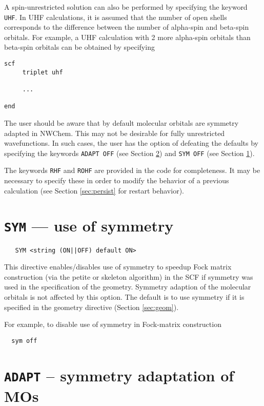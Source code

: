 A spin-unrestricted solution can also be performed by specifying the
keyword \verb+UHF+.  In UHF calculations, it is assumed that the
number of open shells corresponds to the difference between the number
of alpha-spin and beta-spin orbitals.  For example, a UHF calculation
with 2 more alpha-spin orbitals than beta-spin orbitals can be
obtained by specifying

\begin{verbatim}
scf
     triplet uhf

     ...

end
\end{verbatim}

The user should be aware that by default molecular orbitals are
symmetry adapted in NWChem.  This may not be desirable for fully
unrestricted wavefunctions.  In such cases, the user has the option of
defeating the defaults by specifying the keywords \verb+ADAPT OFF+
(see Section \ref{sec:adapt}) and \verb+SYM OFF+ (see Section
\ref{sec:sym}).

The keywords \verb+RHF+ and \verb+ROHF+ are provided in the code for
completeness. It may be necessary to specify these in order to modify
the behavior of a previous calculation (see Section \ref{sec:persist}
  for restart behavior).

\section{{\tt SYM} --- use of symmetry}
\label{sec:sym}

 \begin{verbatim}
   SYM <string (ON||OFF) default ON>
 \end{verbatim}

This directive enables/disables use of symmetry to speedup Fock matrix
construction (via the petite or skeleton algorithm) in the SCF if
symmetry was used in the specification of the geometry.  Symmetry
adaption of the molecular orbitals is not affected by this option.
The default is to use symmetry if it is specified in the geometry
directive (Section \ref{sec:geom}). 

For example, to disable use of symmetry in Fock-matrix construction
\begin{verbatim}
  sym off
\end{verbatim}

\section{{\tt ADAPT} -- symmetry adaptation of MOs}
\label{sec:adapt}

